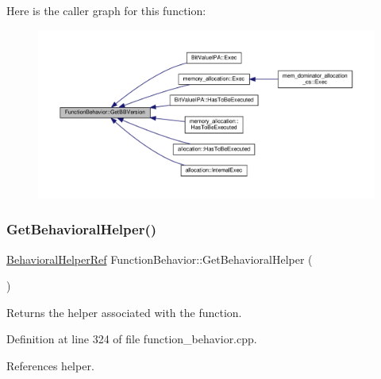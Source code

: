 Here is the caller graph for this function\+:
\nopagebreak
\begin{figure}[H]
\begin{center}
\leavevmode
\includegraphics[width=350pt]{d9/d45/classFunctionBehavior_a5885c28dd9435e6ef9df8c507fbced96_icgraph}
\end{center}
\end{figure}
\mbox{\label{classFunctionBehavior_adc1e32d1edb7233a6bfd3aa413a80077}} 
\subsubsection{\texorpdfstring{Get\+Behavioral\+Helper()}{GetBehavioralHelper()}}
{\footnotesize\ttfamily \hyperlink{behavioral__helper_8hpp_a9da8798985d185e76cbde965d9d68f84}{Behavioral\+Helper\+Ref} Function\+Behavior\+::\+Get\+Behavioral\+Helper (\begin{DoxyParamCaption}{ }\end{DoxyParamCaption})}



Returns the helper associated with the function. 



Definition at line 324 of file function\+\_\+behavior.\+cpp.



References helper.

\mbox{\label{classFunctionBehavior_abe80dcf891e6c460895fcf7f91c46fd9}} 
